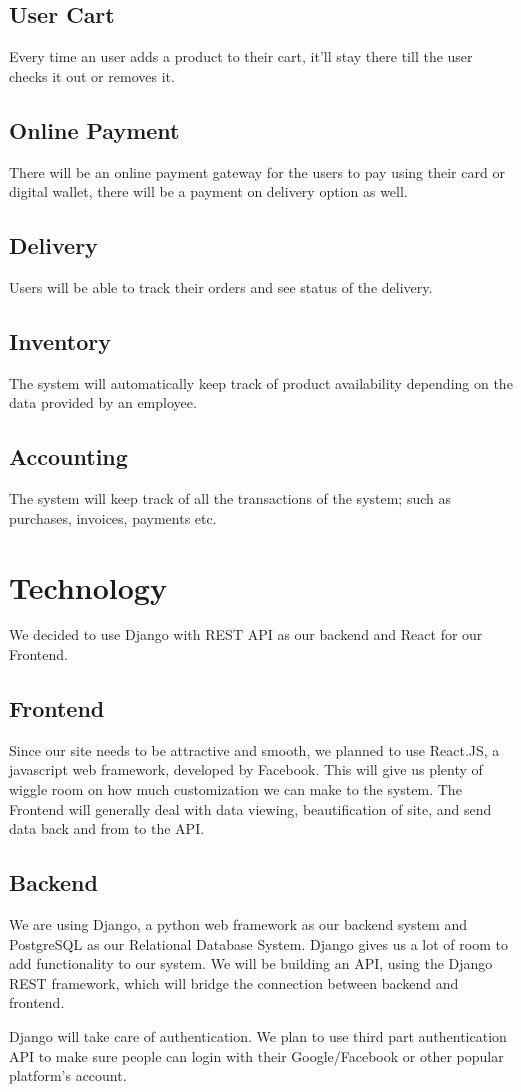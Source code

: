 \documentclass[12pt]{article}
\begin{document}
\subsection{User Cart}
Every time an user adds a product to their cart, it'll stay there till the user checks it out or removes it.

\subsection{Online Payment}
There will be an online payment gateway for the users to pay using their card or digital wallet, there will be a payment on delivery option as well.

\subsection{Delivery}
Users will be able to track their orders and see status of the delivery.

\subsection{Inventory}
The system will automatically keep track of product availability depending on the data provided by an employee.

\subsection{Accounting}
The system will keep track of all the transactions of the system; such as purchases, invoices, payments etc.

\section{Technology}
We decided to use Django with REST API as our backend and React for our Frontend.

\subsection{Frontend}
Since our site needs to be attractive and smooth, we planned to use React.JS, a javascript web framework, developed by Facebook. This will give us plenty of wiggle room on how much customization we can make to the system. The Frontend will generally deal with data viewing, beautification of site, and send data back and from to the API.

\subsection{Backend}
We are using Django, a python web framework as our backend system and PostgreSQL as our Relational Database System. Django gives us a lot of room to add functionality to our system. We will be building an API, using the Django REST framework, which will bridge the connection between backend and frontend. \par
Django will take care of authentication. We plan to use third part authentication API to make sure people can login with their Google/Facebook or other popular platform's account.
\end{document}
